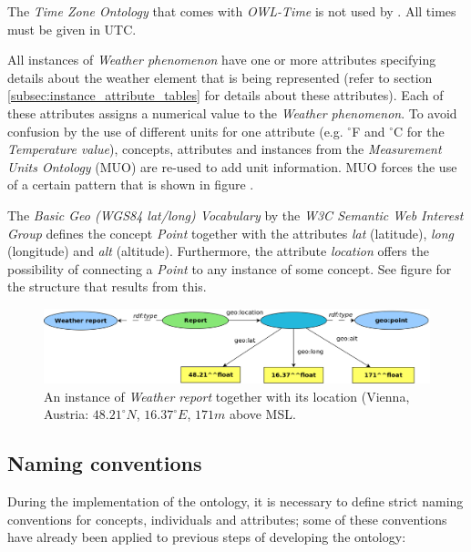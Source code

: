 The \emph{Time Zone Ontology} that comes with \emph{OWL-Time} is not used by \thinkhomeweather. All times must be given in UTC.

All instances of \emph{Weather phenomenon} have one or more attributes specifying details about the weather element that is being represented (refer to section \ref{subsec:instance_attribute_tables} for details about these attributes). Each of these attributes assigns a numerical value to the \emph{Weather phenomenon}. To avoid confusion by the use of different units for one attribute (e.g. $^\circ$F and $^\circ$C for the \emph{Temperature value}), concepts, attributes and instances from the \emph{Measurement Units Ontology} (MUO) are re-used to add unit information. MUO forces the use of a certain pattern that is shown in figure . %

The \emph{Basic Geo (WGS84 lat/long) Vocabulary} by the \emph{W3C Semantic Web Interest Group} defines the concept \emph{Point} together with the attributes \emph{lat} (latitude), \emph{long} (longitude) and \emph{alt} (altitude). Furthermore, the attribute \emph{location} offers the possibility of connecting a \emph{Point} to any instance of some concept. See figure \label{fig:wgs84} for the structure that results from this. %

\begin{figure}
  \includegraphics[width=\textwidth]{figures/diagrams/wgs84.png}
  \caption{An instance of \emph{Weather report} together with its location (Vienna, Austria: $48.21 ^{\circ} N$, $16.37 ^{\circ} E$, $171 m$ above MSL.}
  \label{fig:owl_time}
\end{figure}

\subsection{Naming conventions}

During the implementation of the \thinkhomeweather ontology, it is necessary to define strict naming conventions for concepts, individuals and attributes; some of these conventions have already been applied to previous steps of developing the ontology:

